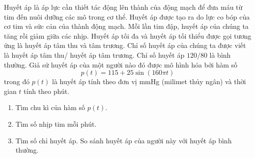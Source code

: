 \begin{bt}
\begin{bt}%
	Huyết áp là áp lực cần thiết tác động lên thành của động mạch để đưa máu từ tim đến nuôi dưỡng các mô trong cơ thể. Huyết áp được tạo ra do lực co bóp của cơ tim và sức cản của thành động mạch. Mỗi lần tim đập, huyết áp của chúng ta tăng rồi giảm giữa các nhịp. Huyết áp tối đa và huyết áp tối thiểu được gọi tương ứng là huyết áp tâm thu và tâm trương. Chỉ số huyết áp của chúng ta được viết là huyết áp tâm thu/ huyết áp tâm trương. Chỉ số huyết áp $120/80$ là bình thường. Giả sử huyết áp của một người nào đó được mô hình hóa bởi hàm số
	$$p(t)=115+25\sin(160\pi t)$$
	trong đó $p(t)$ là huyết áp tính theo đơn vị mmHg (milimet thủy ngân) và thời gian $t$ tính theo phút.
	\begin{enumerate}
		\item Tìm chu kì của hàm số $p(t)$.
		\item Tìm số nhịp tim mỗi phút.
		\item Tìm số chỉ huyết áp. So sánh huyết áp của người này với huyết áp bình thường.
	\end{enumerate}
\end{bt}


\end{bt}
